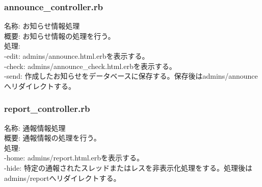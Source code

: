 \documentclass[a4j]{jarticle}
\begin{document}
\subsubsection{announce\_controller.rb}
\noindent 名称: お知らせ情報処理 \\
概要: お知らせ情報の処理を行う。 \\
処理:  \\
-edit: admins/announce.html.erbを表示する。\\
-check: admins/announce\_check.html.erbを表示する。\\
-send: 作成したお知らせをデータベースに保存する。保存後はadmins/announceへリダイレクトする。

\subsubsection{report\_controller.rb}
\noindent 名称: 通報情報処理 \\
概要: 通報情報の処理を行う。 \\
処理:  \\
-home: admins/report.html.erbを表示する。\\
-hide: 特定の通報されたスレッドまたはレスを非表示化処理をする。処理後はadmins/reportへリダイレクトする。



\appendix
\end{document}
